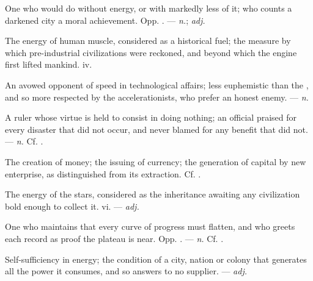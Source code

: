  One who would do without energy, or with markedly less of it; who counts a darkened city a moral achievement. Opp. . ---  \textit{n.};  \textit{adj.}

 The energy of human muscle, considered as a historical fuel; the measure by which pre-industrial civilizations were reckoned, and beyond which the engine first lifted mankind.   iv.

 An avowed opponent of speed in technological affairs; less euphemistic than the , and so more respected by the accelerationists, who prefer an honest enemy. ---  \textit{n.}

 A ruler whose virtue is held to consist in doing nothing; an official praised for every disaster that did not occur, and never blamed for any benefit that did not. ---  \textit{n.} Cf. .

 The creation of money;  the issuing of currency;   the generation of capital by new enterprise, as distinguished from its extraction. Cf. .

 The energy of the stars, considered as the inheritance awaiting any civilization bold enough to collect it.   vi. ---  \textit{adj.}

 One who maintains that every curve of progress must flatten, and who greets each record as proof the plateau is near. Opp. . ---  \textit{n.} Cf. .

 Self-sufficiency in energy; the condition of a city, nation or colony that generates all the power it consumes, and so answers to no supplier. ---  \textit{adj.}

